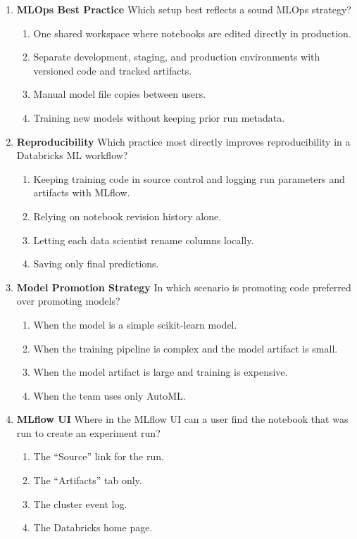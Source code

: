 \documentclass{article}
\begin{document}
\begin{enumerate}[label=\textbf{Q\arabic*.}]
		\item \textbf{MLOps Best Practice}
		Which setup best reflects a sound MLOps strategy?
		\begin{enumerate}[label=\Alph*.]
			\item One shared workspace where notebooks are edited directly in production.
			\item Separate development, staging, and production environments with versioned code and tracked artifacts.
			\item Manual model file copies between users.
			\item Training new models without keeping prior run metadata.
		\end{enumerate}
		
		\item \textbf{Reproducibility}
		Which practice most directly improves reproducibility in a Databricks ML workflow?
		\begin{enumerate}[label=\Alph*.]
			\item Keeping training code in source control and logging run parameters and artifacts with MLflow.
			\item Relying on notebook revision history alone.
			\item Letting each data scientist rename columns locally.
			\item Saving only final predictions.
		\end{enumerate}
		
		\item \textbf{Model Promotion Strategy}
		In which scenario is promoting code preferred over promoting models?
		\begin{enumerate}[label=\Alph*.]
			\item When the model is a simple scikit-learn model.
			\item When the training pipeline is complex and the model artifact is small.
			\item When the model artifact is large and training is expensive.
			\item When the team uses only AutoML.
		\end{enumerate}
		
		\item \textbf{MLflow UI}
		Where in the MLflow UI can a user find the notebook that was run to create an experiment run?
		\begin{enumerate}[label=\Alph*.]
			\item The ``Source'' link for the run.
			\item The ``Artifacts'' tab only.
			\item The cluster event log.
			\item The Databricks home page.
		\end{enumerate}
		

\end{enumerate}
\end{document}
